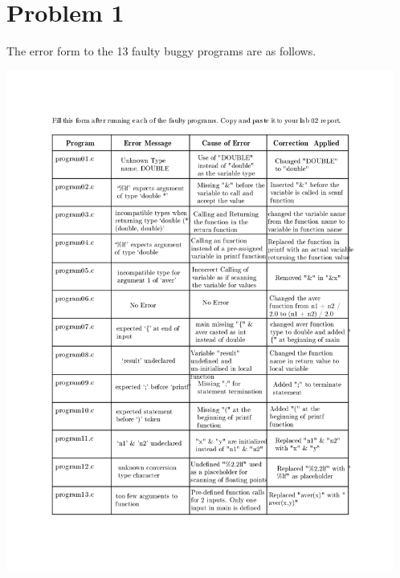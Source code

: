 {}

\section{{Problem 1}}

	{The error form to the 13 faulty buggy programs are as follows.}

	\includegraphics[width=12.75cm]{Error Form.jpg}

	{}





